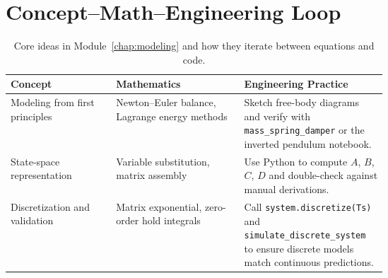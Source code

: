 \section{Concept--Math--Engineering Loop}
\begin{table}[h]
    \centering
    \small
    \renewcommand{\arraystretch}{1.2}
    \begin{tabularx}{\linewidth}{|>{\raggedright\arraybackslash}p{0.28\linewidth}|>{\raggedright\arraybackslash}p{0.34\linewidth}|>{\raggedright\arraybackslash}X|}
        \hline
        \textbf{Concept} & \textbf{Mathematics} & \textbf{Engineering Practice} \\
        \hline
        Modeling from first principles & Newton--Euler balance, Lagrange energy methods & Sketch free-body diagrams and verify with \texttt{mass\_spring\_damper} or the inverted pendulum notebook. \\
        \hline
        State-space representation & Variable substitution, matrix assembly & Use Python to compute $A$, $B$, $C$, $D$ and double-check against manual derivations. \\
        \hline
        Discretization and validation & Matrix exponential, zero-order hold integrals & Call \texttt{system.discretize(Ts)} and \texttt{simulate\_discrete\_system} to ensure discrete models match continuous predictions. \\
        \hline
    \end{tabularx}
    \caption{Core ideas in Module~\ref{chap:modeling} and how they iterate between equations and code.}
\end{table}

